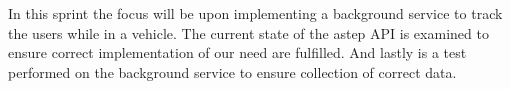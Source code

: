 In this sprint the focus will be upon implementing a background service to track the users while in a vehicle.
The current state of the \gls{astep} API is examined to ensure correct implementation of our need are fulfilled.
And lastly is a test performed on the background service to ensure collection of correct data.